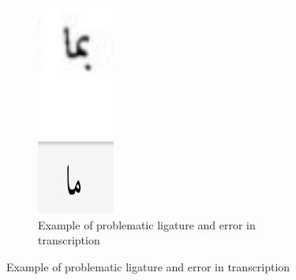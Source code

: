 \begin{figure}[h]
	\centering
	\begin{subfigure}[b]{0.3\linewidth}
	\centering
	\includegraphics[width=\linewidth]{images/image21.png}
	\caption{Example of problematic ligature and error in transcription}
	\label{fig:fig9}
	\end{subfigure}


\end{figure}
